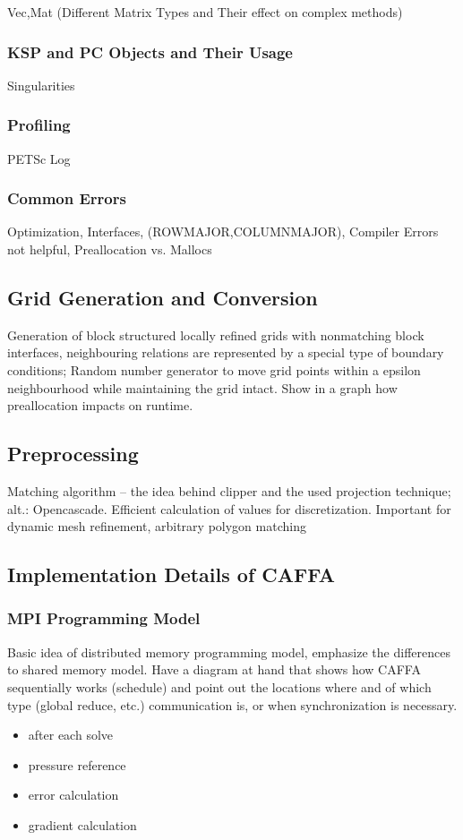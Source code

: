 \documentclass[article,type=msc,colorback,accentcolor=tud2a]{tudthesis}
\begin{document}
        Vec,Mat (Different Matrix Types and Their effect on complex methods)

      \subsubsection{KSP and PC Objects and Their Usage}

        Singularities

      \subsubsection{Profiling}

        PETSc Log 

      \subsubsection{Common Errors}

      Optimization, Interfaces, (ROWMAJOR,COLUMNMAJOR), Compiler Errors not helpful, Preallocation vs. Mallocs

    \subsection{Grid Generation and Conversion}

      Generation of block structured locally refined grids with nonmatching block interfaces, neighbouring relations are represented by a special type of boundary conditions; Random number generator to move grid points within a epsilon neighbourhood while maintaining the grid intact. Show in a graph how preallocation impacts on runtime.
    \subsection{Preprocessing}
    Matching algorithm -- the idea behind clipper and the used projection technique; alt.: Opencascade. Efficient calculation of values for discretization. Important for dynamic mesh refinement, arbitrary polygon matching
    \subsection{Implementation Details of CAFFA}

      \subsubsection{MPI Programming Model}
        Basic idea of distributed memory programming model, emphasize the differences to shared memory model. Have a diagram at hand that shows how CAFFA sequentially works (schedule) and point out the locations where and of which type (global reduce, etc.) communication is, or when synchronization is necessary.
        \begin{itemize}
          \item after each solve
          \item pressure reference
          \item error calculation
          \item gradient calculation
        \end{itemize}
        
\end{document}

